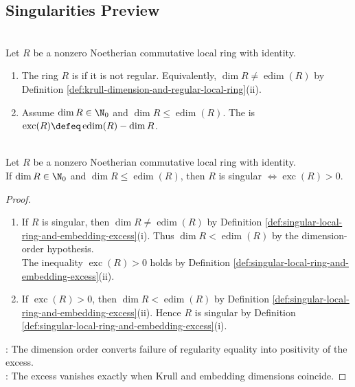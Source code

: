 \subsection{Singularities Preview}

\begin{definition} \label{def:singular-local-ring-and-embedding-excess}
\\
Let $R$ be a nonzero Noetherian commutative local ring with identity.
\begin{enumerate}[label=(\roman*)]
\setlength{\itemsep}{0pt}
\item The ring $R$ is  if it is not regular. Equivalently, $\dim R\neq\operatorname{edim}(R)$ by Definition \ref{def:krull-dimension-and-regular-local-ring}(ii).
\item Assume $\dim R\in\N_0$ and $\dim R\leq\operatorname{edim}(R)$. The  is $\operatorname{exc}(R)\defeq\operatorname{edim}(R)-\dim R$.
\end{enumerate}
\end{definition}

\begin{proposition} \label{prop:positive-embedding-excess-detects-singularity}
\\
Let $R$ be a nonzero Noetherian commutative local ring with identity.\\
If $\dim R\in\N_0$ and $\dim R\leq\operatorname{edim}(R)$, then $R$ is singular $\Longleftrightarrow\operatorname{exc}(R)>0$.
\begin{proof}
\begin{enumerate}[label=\roman*.]
\setlength{\itemsep}{0pt}
\item[$(\Rightarrow)$] If $R$ is singular, then $\dim R\neq\operatorname{edim}(R)$ by Definition \ref{def:singular-local-ring-and-embedding-excess}(i). Thus $\dim R<\operatorname{edim}(R)$ by the dimension-order hypothesis.\\
The inequality $\operatorname{exc}(R)>0$ holds by Definition \ref{def:singular-local-ring-and-embedding-excess}(ii).
\item[$(\Leftarrow)$] If $\operatorname{exc}(R)>0$, then $\dim R<\operatorname{edim}(R)$ by Definition \ref{def:singular-local-ring-and-embedding-excess}(ii). Hence $R$ is singular by Definition \ref{def:singular-local-ring-and-embedding-excess}(i).
\end{enumerate}
: The dimension order converts failure of regularity equality into positivity of the excess.\\
: The excess vanishes exactly when Krull and embedding dimensions coincide.
\end{proof}
\end{proposition}

